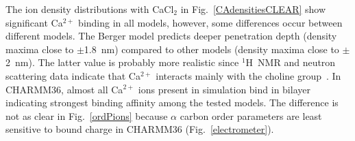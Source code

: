 \documentclass[pre,aps,floatfix,authordate1-4,twocolumn]{revtex4-1}
\begin{document}

The ion density distributions with CaCl$_2$ in Fig.~\ref{CAdensitiesCLEAR} show significant
Ca$^{2+}$ binding in all models, however, some differences occur between different models.
The Berger model predicts deeper penetration depth (density maxima close to $\pm$1.8~nm) compared
to other models (density maxima close to $\pm$2~nm). The latter value is probably more realistic 
since $^1$H~NMR and neutron scattering data indicate that Ca$^{2+}$ interacts mainly with the 
choline group~\cite{hauser76,hauser78,herbette84,cevc90}. In CHARMM36, almost all Ca$^{2+}$
ions present in simulation bind in bilayer indicating strongest binding affinity among the tested
models. The difference is not as clear in Fig.~\ref{ordPions} because $\alpha$ carbon order parameters 
are least sensitive to bound charge in CHARMM36 (Fig.~\ref{electrometer}).
\end{document}
